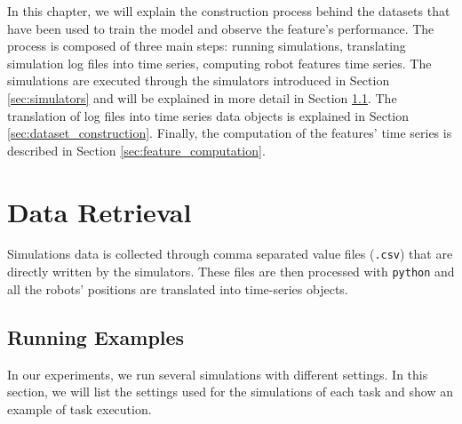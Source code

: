 \documentclass[../../Thesis.tex]{subfiles}
\begin{document}
	
	In this chapter, we will explain the construction process behind the datasets that have been used to train the model and observe the feature's performance. The process is composed of three main steps: running simulations, translating simulation log files into time series, computing robot features time series. The simulations are executed through the simulators introduced in Section \ref{sec:simulators} and will be explained in more detail in Section \ref{sec:running_examples}. The translation of log files into time series data objects is explained in Section \ref{sec:dataset_construction}. Finally, the computation of the features' time series is described in Section \ref{sec:feature_computation}.
	
	\section{Data Retrieval}
		Simulations data is collected through comma separated value files (\verb|.csv|) that are directly written by the simulators. These files are then processed with \verb|python| and all the robots' positions are translated into time-series objects. 
		
		\subsection{Running Examples}
		\label{sec:running_examples} %
			In our experiments, we run several simulations with different settings.  In this section, we will list the settings used for the simulations of each task and show an example of task execution.
\end{document}
